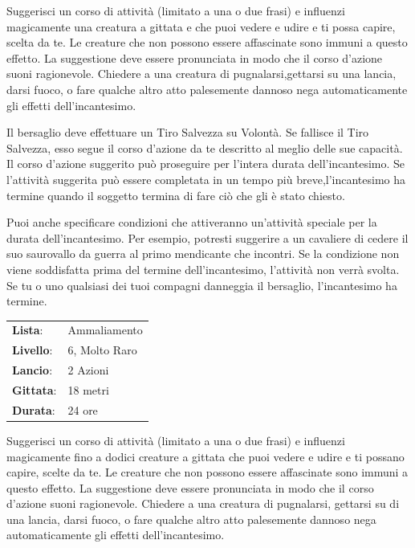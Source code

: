 \begin{multicols}{2}
Suggerisci un corso di attività (limitato a una o due frasi) e influenzi magicamente una creatura a gittata e che puoi vedere e udire e ti possa capire, scelta da te. Le creature che non possono essere affascinate sono immuni a questo effetto. La suggestione deve essere pronunciata in modo che il corso d'azione suoni ragionevole. Chiedere a una creatura di pugnalarsi,gettarsi su una lancia, darsi fuoco, o fare qualche altro atto palesemente dannoso nega automaticamente gli effetti dell'incantesimo.

Il bersaglio deve effettuare un Tiro Salvezza su Volontà. Se fallisce il Tiro Salvezza, esso segue il corso d'azione da te descritto al meglio delle sue capacità. Il corso d'azione suggerito può proseguire per l'intera durata dell'incantesimo. Se l'attività suggerita può essere completata in un tempo più breve,l'incantesimo ha termine quando il soggetto termina di fare ciò che gli è stato chiesto.

Puoi anche specificare condizioni che attiveranno un'attività speciale per la durata dell'incantesimo. Per esempio, potresti suggerire a un cavaliere di cedere il suo saurovallo da guerra al primo mendicante che incontri. Se la condizione non viene soddisfatta prima del termine dell'incantesimo, l'attività non verrà svolta. Se tu o uno qualsiasi dei tuoi compagni danneggia il bersaglio, l'incantesimo ha termine.

\noindent\begin{tabularx}{\linewidth}{p{1.3cm}X}
	\rowcolor{gray!20}\textbf{Lista}: & Ammaliamento \\
	\textbf{Livello}: & 6, Molto Raro \\
	\rowcolor{gray!20}\textbf{Lancio}: & 2 Azioni \\
	\textbf{Gittata}: & 18 metri \\
	\rowcolor{gray!20}\textbf{Durata}: & 24 ore \\
\end{tabularx}\smallskip

Suggerisci un corso di attività (limitato a una o due frasi) e influenzi magicamente fino a dodici creature a gittata che puoi vedere e udire e ti possano capire, scelte da te. Le creature che non possono essere affascinate sono immuni a questo effetto. La suggestione deve essere pronunciata in modo che il corso d'azione suoni ragionevole. Chiedere a una creatura di pugnalarsi, gettarsi su di una lancia, darsi fuoco, o fare qualche altro atto palesemente dannoso nega automaticamente gli effetti dell'incantesimo.


\end{multicols}
